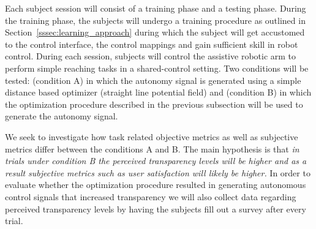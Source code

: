 \documentclass[12pt]{article}
\begin{document}
Each subject session will consist of a training phase and a testing phase. During the training phase, the subjects will undergo a training procedure as outlined in Section~\ref{sssec:learning_approach} during which the subject will get accustomed to the control interface, the control mappings and gain sufficient skill in robot control. 
During each session, subjects will control the assistive robotic arm to perform simple reaching tasks in a shared-control setting. Two conditions will be tested: (condition A) in which the autonomy signal is generated using a simple distance based optimizer (straight line potential field) and (condition B) in which the optimization procedure described in the previous subsection will be used to generate the autonomy signal.

We seek to investigate how task related objective metrics as well as subjective metrics differ between the conditions A and B. The main hypothesis is that \textit{in trials under condition B the perceived transparency levels will be higher and as a result subjective metrics such as user satisfaction will likely be higher.} In order to evaluate whether the optimization procedure resulted in generating autonomous control signals that increased transparency we will also collect data regarding perceived transparency levels by having the subjects fill out a survey after every trial.

%
%
%
%
%

\end{document}
